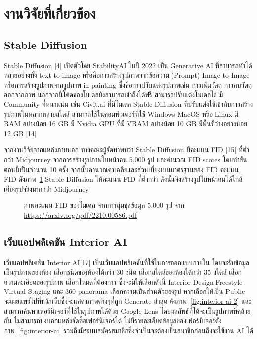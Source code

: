\documentclass[12pt,oneside,openright,a4paper]{cpe-thai-project}
\begin{document}
\section{งานวิจัยที่เกี่ยวข้อง}

\subsection{Stable Diffusion}
\hspace {18pt}Stable Diffusion [4] เปิดตัวโดย StabilityAI ในปี 2022 เป็น Generative AI ที่สามารถทำได้หลายอย่างทั้ง text-to-image หรือคือการสร้างรูปภาพจากข้อความ (Prompt) Image-to-Image หรือการสร้างรูปภาพจากรูปภาพ in-painting ซึ่งคือการปรับแต่งรูปภาพเช่น การเพิ่มวัตถุ การลบวัตถุออกจากภาพ นอกจากนี้โค้ดของโมเดลยังสามารถเข้าถึงได้ฟรี สามารถปรับแต่งโมเดลได้ มี Community ที่หนาแน่น เช่น Civit.ai ที่มีโมเดล Stable Diffusion ที่ปรับแต่งให้เข้ากับการสร้างรูปภาพในหลากหลายสไตล์ สามารถใช้ในคอมพิวเตอร์ที่ใช้ Windows MacOS หรือ Linux มี RAM อย่างน้อย 16 GB มี Nvidia GPU ที่มี VRAM อย่างน้อย 10 GB มีพื้นที่ว่างอย่างน้อย 12 GB [14]

\hspace {18pt} จากงานวิจัยจากแหล่งภายนอก ทางคณะผู้จัดทำพบว่า Stable Diffusion มีคะแนน FID [15] ที่ต่ำกว่า Midjourney จากการสร้างรูปภาพใบหน้าคน 5,000 รูป และคำนวณ FID scores โดยทำขั้นตอนนี้เป็นจำนวน 10 ครั้ง จากนั้นคำนวณค่าเฉลี่ยและส่วนเบี่ยงเบนมาตรฐานของ FID คะแนน FID ดังภาพ~\ref{fig:fid} Stable Diffusion ให้คะแนน FID ที่ต่ำกว่า ดังนั้นจึงสร้างรูปใบหน้าคนได้ใกล้เคียงรูปจริงมากกว่า Midjourney

\begin{figure}[!h]\centering
{}
\caption{ภาพคะแนน FID ของโมเดล จากการสุ่มชุดข้อมูล 5,000 รูป จาก \url{https://arxiv.org/pdf/2210.00586.pdf}}
\label{fig:fid}
\end{figure}

\subsection{เว็บแอปพลิเคชัน Interior AI}
\hspace {18pt} เว็บแอปพลิเคชัน Interior AI[17] เป็นเว็บแอปพลิเคชันที่ใช้ในการออกแบบภายใน โดยจะรับข้อมูลเป็นรูปภาพของห้อง เลือกชนิดของห้องได้กว่า 30 ชนิด เลือกสไตล์ของห้องได้กว่า 35 สไตล์ เลือกความละเอียดของรูปภาพ เลือกโหมดที่ต้องการ ซึ่งจะมีให้เลือกดังนี้ Interior Design Freestyle Virtual Staging และ 360 panorama เลือกความเป็นส่วนตัวของรูป หากเลือกให้เป็น Public จะเผยแพร่ไปที่หน้าเว็บซึ่งจะแสดงภาพต่างๆที่ถูก Generate ล่าสุด ดังภาพ~\ref{fig:interior-ai-2} และสามารถค้นหาเฟอร์นิเจอร์ที่ใช้ในรูปภาพได้ด้วย Google Lens โดยผลลัพธ์ที่ได้จะเป็นรูปภาพที่คล้ายกัน ไม่สามารถบ่งบอกแหล่งจัดซื้อเฟอร์นิเจอร์ได้ ไม่มีรายละเอียดข้อมูลของเฟอร์นิเจอร์ดังภาพ~\ref{fig:interior-ai} รวมถึงมีระบบสมัครสมาชิกซึ่งจำเป็นจะต้องเป็นสมาชิกก่อนถึงจะใช้งาน AI ได้ 
\end{document}
